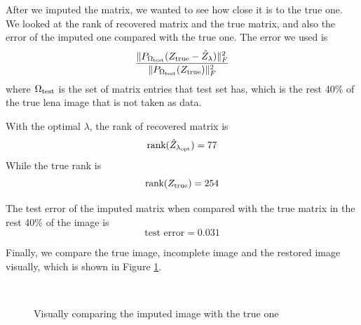 \documentclass{article}
\begin{document}
	After we imputed the matrix, we wanted to see how close it is to the true one. We looked at the rank of recovered matrix and the true matrix, and also the error of the imputed one compared with the true one. The error we used is 
	\begin{equation} \label{test_error}
	\frac{\|P_{\Omega_{\rm test}}(Z_{\rm true} - \hat{Z}_{\lambda})\|_{F}^2}{\|P_{\Omega_{\rm test}}(Z_{\rm true})\|_F^2} 
	\end{equation}
	where $\Omega_{\rm test}$ is the set of matrix entries that test set has, which is the rest 40\% of the true lena image that is not taken as data.

	With the optimal $\lambda$, the rank of recovered matrix is
	\[\textrm{rank} (\hat{Z}_{\lambda_{\rm opt}}) = 77\]
	While the true rank is
	\[\textrm{rank}(Z_{\rm true}) = 254\]

	The test error of the imputed matrix when compared with the true matrix in the rest 40\% of the image is  
	\[\textrm{test error} = 0.031\]

	Finally, we compare the true image, incomplete image and the restored image visually, which is shown in Figure \ref{lena}.
	\begin{figure}[!htb]
    \centering
    ~ 
     ~ 
    \caption{Visually comparing the imputed image with the true one}
    \label{lena}
\end{figure}
	
\end{document}
